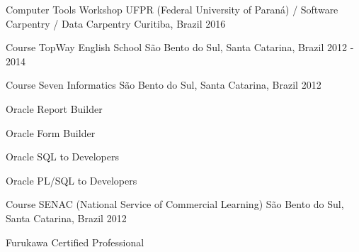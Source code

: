 

\begin{cventries}

  \cventry
	{Computer Tools Workshop} %
	{UFPR (Federal University of Paraná) / Software Carpentry / Data Carpentry} %
	{Curitiba, Brazil} %
	{2016} %
	{
	}

  \cventry
    {Course} %
    {TopWay English School} %
    {São Bento do Sul, Santa Catarina, Brazil} %
    {2012 - 2014} %
    {
    }

  \cventry
    {Course} %
    {Seven Informatics} %
    {São Bento do Sul, Santa Catarina, Brazil} %
    {2012} %
    {
      \begin{cvitems} %
        \item {Oracle Report Builder}
        \item {Oracle Form Builder}
        \item {Oracle SQL to Developers}
        \item {Oracle PL/SQL to Developers}
      \end{cvitems}
    }

  \cventry
	{Course} %
	{SENAC (National Service of Commercial Learning)} %
	{São Bento do Sul, Santa Catarina, Brazil} %
	{2012} %
	{
	    \begin{cvitems} %
	      \item {Furukawa Certified Professional}
	    \end{cvitems}
	}

\end{cventries}
